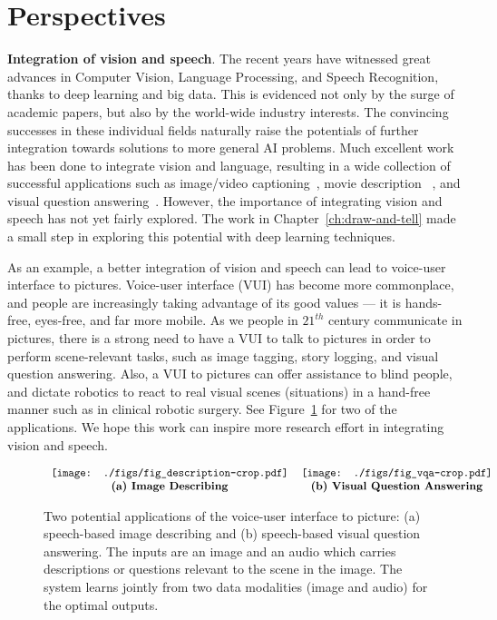 \section{Perspectives} 

\textbf{Integration of vision and speech}. 
The recent years have witnessed great advances in Computer Vision,
Language Processing, and Speech Recognition, thanks to deep learning
and big data. This is evidenced not only by the surge of academic papers, but also by the world-wide industry interests. 
The convincing successes in these individual fields naturally raise
the potentials of further integration towards solutions to more general AI
problems. Much excellent work has been done to integrate vision and
language, resulting in a wide collection of successful applications
such as image/video captioning~\citep{show:tell:caption}, movie description
~\citep{movie:dataset}, and visual question answering~\citep{VQA}. However, the importance of integrating vision and
speech has not yet fairly explored.  The work in Chapter~\ref{ch:draw-and-tell} made a small step in exploring this
potential with deep learning techniques.  

As an example, a better integration of vision and speech can lead to voice-user interface to pictures.  
Voice-user interface (VUI) has become more commonplace, and people are increasingly taking advantage of its good values --- it is hands-free, eyes-free, and far more mobile. As we people in $21^{th}$ century communicate in pictures,  there is a strong need to have a VUI to talk to pictures in order to perform scene-relevant tasks, such as image tagging, story logging, and visual question answering. Also, a VUI to pictures can offer assistance to blind people, and dictate robotics to react to real visual scenes (situations) in a hand-free manner such as in clinical robotic surgery. See Figure~\ref{con:fig:app} for two of the applications. 
We hope this work can inspire more research effort in integrating vision and speech. 

\begin{figure}
$\begin{tabular}{cccccc}
\texttt{[image: ./figs/fig\_description-crop.pdf]} &
\texttt{[image: ./figs/fig\_vqa-crop.pdf]} \\
\text{\textbf{(a) Image Describing}} &  
\text{\textbf{(b) Visual Question Answering}} \\  
\end{tabular}$
\caption{Two potential applications of the voice-user interface to picture: (a) speech-based
  image describing and (b) speech-based visual question answering. The
  inputs are an image and an audio which carries descriptions or questions relevant to the scene in the image. The system learns jointly from two data modalities (image and audio) for the optimal outputs.} 
\label{con:fig:app} 
\end{figure}

